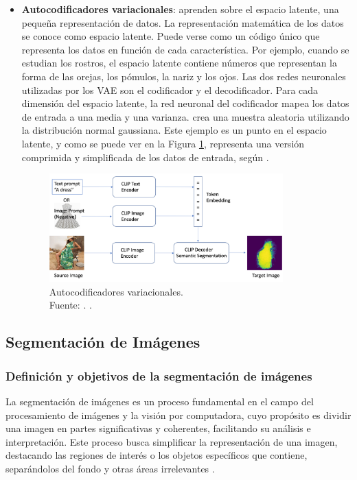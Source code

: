 \begin{itemize}
	\item \textbf{Autocodificadores variacionales}: aprenden sobre el espacio latente, una pequeña representación de datos. La representación matemática de los datos se conoce como espacio latente. Puede verse como un código único que representa los datos en función de cada característica. Por ejemplo, cuando se estudian los rostros, el espacio latente contiene números que representan la forma de las orejas, los pómulos, la nariz y los ojos. Las dos redes neuronales utilizadas por los VAE son el codificador y el decodificador. Para cada dimensión del espacio latente, la red neuronal del codificador mapea los datos de entrada a una media y una varianza. crea una muestra aleatoria utilizando la distribución normal gaussiana. Este ejemplo es un punto en el espacio latente, y como se puede ver en la Figura \ref{2:fig60}, representa una versión comprimida y simplificada de los datos de entrada, según \parencite{tec_amaz2023iagen}.
	
	\begin{figure}[!ht]
		\begin{center}
			\includegraphics[width=0.85\textwidth]{2/figures/autocodificadoresvariacionales.png}
			\caption[Autocodificadores variacionales]{Autocodificadores variacionales.\\
			Fuente: \cite{tec_amaz2023iagen}. .}
			\label{2:fig60}
		\end{center}
	\end{figure}
\end{itemize}


\subsection{Segmentación de Imágenes}
\subsubsection{Definición y objetivos de la segmentación de imágenes}
La segmentación de imágenes es un proceso fundamental en el campo del procesamiento de imágenes y la visión por computadora, cuyo propósito es dividir una imagen en partes significativas y coherentes, facilitando su análisis e interpretación. Este proceso busca simplificar la representación de una imagen, destacando las regiones de interés o los objetos específicos que contiene, separándolos del fondo y otras áreas irrelevantes \parencite{gonzalez2018}.

